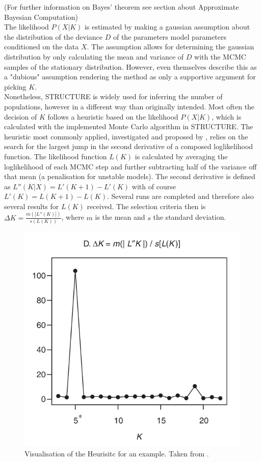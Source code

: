 \documentclass[a4paper, 11pt]{article}
\begin{document}
(For further information on Bayes' theorem see section about Approximate Bayesian Computation)\\
The likelihood $P(X|K)$ is estimated by making a gaussian assumption about the distribution of the deviance $D$ of the parameters model parameters conditioned on the data $X$. The assumption allows for determining the gaussian distribution by only calculating the mean and variance of $D$ with the MCMC samples of the stationary distribution. However, even \textcite{pritchard2000inference} themselves describe this as a "dubious" assumption rendering the method as only a supportive argument for picking $K$.\\
Nonetheless, STRUCTURE is widely used for inferring the number of populations, however in a different way than originally intended. Most often the decision of $K$ follows a heuristic based on the likelihood $P(X|K)$, which is calculated with the implemented Monte Carlo algorithm in STRUCTURE. The heuristic most commonly applied, investigated and proposed by \cite{evanno2005detecting}, relies on the search for the largest jump in the second derivative of a composed loglikelihood function. The likelihood function $L(K)$ is calculated by averaging the loglikelihood of each MCMC step and further subtracting half of the variance off that mean (a penalisation for unstable models). The second derivative is defined as $L''(K|X) = L'(K+1) - L'(K)$ with of course $L'(K) = L(K+1) - L(K)$. Several runs are completed and therefore also several results for $L(K)$ received. The selection criteria then is $\Delta K = \frac{m(|L''(K)|)}{s(L(K))}$, where $m$ is the mean and $s$ the standard deviation. \\
\begin{figure}
\centering
\includegraphics[scale=0.4]{delta_K}
\caption{Visualisation of the Heurisitc for an example. Taken from \cite{evanno2005detecting}.}
\end{figure}
\end{document}
